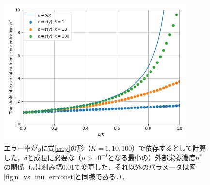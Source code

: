 \begin{figure}[htbp]
  \centering
  \includegraphics[width=10cm]{err_vs_n_errslope_s1_K.png}
  \caption{エラー率が$y$に式\eqref{erry}の形（$K=1,10,100$）で依存するとして計算した，$\delta$と成長に必要な（$\mu > 10^{-3}$となる最小の）外部栄養濃度$n^*$の関係（$n$は刻み幅0.01で変更した．それ以外のパラメータは図\ref{fig:n_vs_mu_errconst}と同様である．）．}
  \label{fig:err_vs_n_errslope_s1}
\end{figure}
